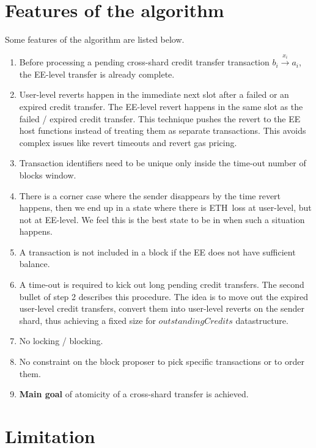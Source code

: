 \documentclass{IEEEtran}
\newcommand{\eth}[0]{ETH~}
\begin{document}
\section{Features of the algorithm}
Some features of the algorithm are listed below.
\begin{enumerate}
\item Before processing a pending cross-shard credit transfer transaction $b_i \stackrel{x_i}{\longrightarrow} a_i$, the EE-level transfer is already complete. 
\item User-level reverts happen in the immediate next slot after a failed or an expired credit transfer. The EE-level revert happens in the same slot as the failed / expired credit transfer. This technique pushes the revert to the EE host functions instead of treating them as separate transactions. This avoids complex issues like revert timeouts and revert gas pricing.
\item Transaction identifiers need to be unique only inside the time-out number of blocks window.
\item  There is a corner case where the sender disappears by the time revert happens, then we end up in a state where there is \eth loss at user-level, but not at EE-level. We feel this is the best state to be in when such a situation happens.
\item A transaction is not included in a block if the EE does not have sufficient balance. 
\item A time-out is required to kick out long pending credit transfers. The second bullet of step 2 describes this procedure. The idea is to move out the expired user-level credit transfers, convert them into user-level reverts on the sender shard, thus achieving a fixed size for $outstandingCredits$ datastructure.
\item No locking / blocking.
\item No constraint on the block proposer to pick specific transactions or to order them.
\item {\bf Main goal} of atomicity of a cross-shard transfer is achieved.
\end{enumerate}

\section{Limitation}
\end{document}
